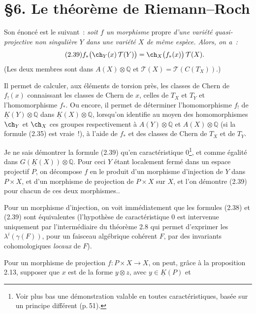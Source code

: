 \section*{\S 6. Le théorème de Riemann--Roch}

Son énoncé est le suivant~: \emph{soit \(f\) un morphisme} propre \emph{d'une variété quasi-projective non singulière \(Y\) dans une variété \(X\) de même espèce. Alors, on a~:}
\begin{equation}\tag{2.39}
 f_*\bigl(\ch_Y(x)\,\mathcal T(Y)\bigr)
 =
 \ch_X\bigl(f_*(x)\bigr)\,\mathcal T(X).
\end{equation}
(Les deux membres sont dans \(A(X)\otimes\mathbb Q\) et \(\mathcal T(X)=\mathcal T(C(T_X))\).)

Il permet de calculer, aux éléments de torsion près, les classes de Chern de \(f_!(x)\) connaissant les classes de Chern de \(x\), celles de \(T_X\) et \(T_Y\) et l'homomorphisme \(f_*\). Ou encore, il permet de déterminer l'homomorphisme
\(f_!\) de \(\underline K(Y)\otimes\mathbb Q\) dans \(\underline K(X)\otimes\mathbb Q\), lorsqu'on identifie au moyen des homomorphismes \(\ch_Y\) et \(\ch_X\) ces groupes respectivement à \(A(Y)\otimes\mathbb Q\) et \(A(X)\otimes\mathbb Q\) (si la formule (2.35) est vraie~!), à l'aide de \(f_*\) et des classes de Chern de \(T_X\) et de \(T_Y\).

Je ne sais démontrer la formule (2.39) qu'en caractéristique \(0\)\footnote{Voir plus bas une démonstration valable en toutes caractéristiques, basée sur un principe différent (p.\,51).}, et comme égalité dans \(G(\underline K(X))\otimes\mathbb Q\). Pour ceci \(Y\) étant localement fermé dans un espace projectif \(P\), on décompose \(f\) en le produit d'un morphisme d'injection de \(Y\) dans \(P\times X\), et d'un morphisme de projection de \(P\times X\) sur \(X\), et l'on démontre (2.39) pour chacun de ces deux morphismes..

Pour un morphisme d'injection, on voit immédiatement que les formules (2.38) et (2.39) sont équivalentes (l'hypothèse de caractéristique \(0\) est intervenue uniquement par l'intermédiaire du théorème 2.8 qui permet d'exprimer les \(\lambda^i(\gamma(F))\), pour un faisceau algébrique cohérent \(F\), par des invariants cohomologiques \emph{locaux} de \(F\)).

Pour un morphisme de projection \(f:P\times X\longrightarrow X\), on peut, grâce à la proposition 2.13, supposer que \(x\) est de la forme \(y\otimes z\), avec \(y\in\underline K(P)\) et 

